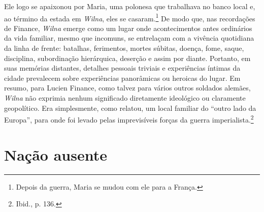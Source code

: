 Ele logo se apaixonou por Maria, uma polonesa que trabalhava no banco
local e, ao término da estada em \textit{Wilna}, eles se casaram.\footnote{Depois da
guerra, Maria se mudou com ele para a França.} De modo que, nas
recordações de Finance, \textit{Wilna} emerge como um lugar onde acontecimentos
antes ordinários da vida familiar, mesmo que incomuns, se entrelaçam com
a vivência quotidiana da linha de frente: batalhas, ferimentos, mortes
súbitas, doença, fome, saque, disciplina, subordinação hierárquica,
deserção e assim por diante. Portanto, em suas memórias distantes,
detalhes pessoais triviais e experiências íntimas da cidade prevalecem
sobre experiências panorâmicas ou heroicas do lugar. Em resumo, para
Lucien Finance, como talvez para vários outros soldados alemães, \textit{Wilna}
não exprimia nenhum significado diretamente ideológico ou claramente
geopolítico. Era simplesmente, como relatou, um local familiar do
``outro lado da Europa'', para onde foi levado pelas imprevisíveis
forças da guerra imperialista.\footnote{Ibid., p. 136.}

\chapter{Nação ausente}

\begin{epigraphs} 
\end{epigraphs}

